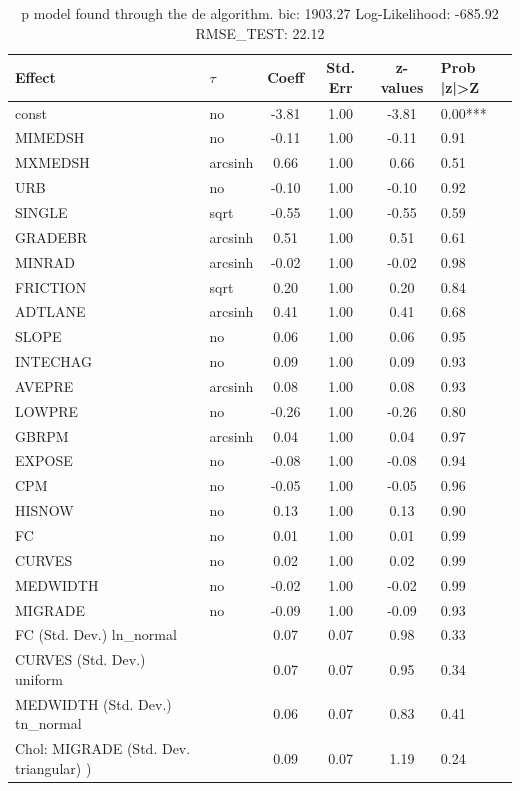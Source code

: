 \begin{table}
	\caption{p model found through the de algorithm. bic: 1903.27 Log-Likelihood: -685.92 RMSE_TEST: 22.12}
	\begin{center}
		\begin{tabular}{|l|l|c|c|c|l|}
			\hline
			Effect & $\tau$ & Coeff & Std. Err & z-values & Prob |z|>Z \\
			\hline
			const & no & -3.81 & 1.00 & -3.81 & 0.00*** \\
			\hline
			MIMEDSH & no & -0.11 & 1.00 & -0.11 & 0.91 \\
			\hline
			MXMEDSH & arcsinh & 0.66 & 1.00 & 0.66 & 0.51 \\
			\hline
			URB & no & -0.10 & 1.00 & -0.10 & 0.92 \\
			\hline
			SINGLE & sqrt & -0.55 & 1.00 & -0.55 & 0.59 \\
			\hline
			GRADEBR & arcsinh & 0.51 & 1.00 & 0.51 & 0.61 \\
			\hline
			MINRAD & arcsinh & -0.02 & 1.00 & -0.02 & 0.98 \\
			\hline
			FRICTION & sqrt & 0.20 & 1.00 & 0.20 & 0.84 \\
			\hline
			ADTLANE & arcsinh & 0.41 & 1.00 & 0.41 & 0.68 \\
			\hline
			SLOPE & no & 0.06 & 1.00 & 0.06 & 0.95 \\
			\hline
			INTECHAG & no & 0.09 & 1.00 & 0.09 & 0.93 \\
			\hline
			AVEPRE & arcsinh & 0.08 & 1.00 & 0.08 & 0.93 \\
			\hline
			LOWPRE & no & -0.26 & 1.00 & -0.26 & 0.80 \\
			\hline
			GBRPM & arcsinh & 0.04 & 1.00 & 0.04 & 0.97 \\
			\hline
			EXPOSE & no & -0.08 & 1.00 & -0.08 & 0.94 \\
			\hline
			CPM & no & -0.05 & 1.00 & -0.05 & 0.96 \\
			\hline
			HISNOW & no & 0.13 & 1.00 & 0.13 & 0.90 \\
			\hline
			FC & no & 0.01 & 1.00 & 0.01 & 0.99 \\
			\hline
			CURVES & no & 0.02 & 1.00 & 0.02 & 0.99 \\
			\hline
			MEDWIDTH & no & -0.02 & 1.00 & -0.02 & 0.99 \\
			\hline
			MIGRADE & no & -0.09 & 1.00 & -0.09 & 0.93 \\
			\hline
			FC (Std. Dev.) ln_normal &  & 0.07 & 0.07 & 0.98 & 0.33 \\
			\hline
			CURVES (Std. Dev.) uniform &  & 0.07 & 0.07 & 0.95 & 0.34 \\
			\hline
			MEDWIDTH (Std. Dev.) tn_normal &  & 0.06 & 0.07 & 0.83 & 0.41 \\
			\hline
			 Chol: MIGRADE (Std. Dev. triangular) ) &  & 0.09 & 0.07 & 1.19 & 0.24 \\
			\hline
		\end{tabular}
	\end{center}
\end{table}